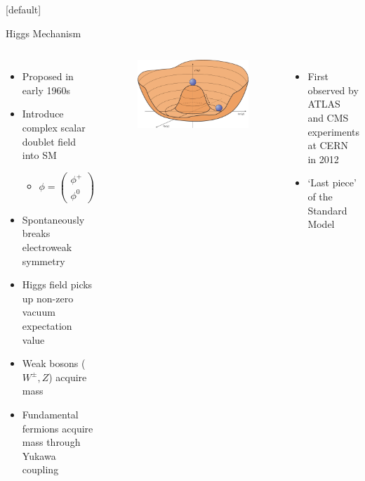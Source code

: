 \documentclass{beamer}
\begin{document}
{  \makeatletter %
  [default]
  \def\beamer@entrycode{\vspace*{-1.075\headheight}}
  \begin{frame} {Higgs Mechanism}
  \begin{columns}
    \begin{itemize}
    \item Proposed in early 1960s
    \item Introduce complex scalar doublet field into SM
      \begin{itemize}
      \vspace{5pt}
      \item$  \phi = 
        \begin{pmatrix}
          \phi^+\\\phi^0
        \end{pmatrix}$
      \end{itemize}
      \vspace{3pt}
      \item Spontaneously breaks electroweak symmetry
      \item Higgs field picks up non-zero vacuum expectation value
      \item Weak bosons ($W^{\pm}, Z$) acquire mass 
      \item Fundamental fermions acquire mass through Yukawa coupling
    \end{itemize}
    \begin{figure}
      \includegraphics[width=\textwidth]{figures/mexicanHat}
    \end{figure}
    \begin{itemize}
    \item First observed by ATLAS and CMS experiments at CERN in 2012
    \item `Last piece' of the Standard Model
    \end{itemize}
  \end{columns}
  \end{frame}


}
\end{document}
